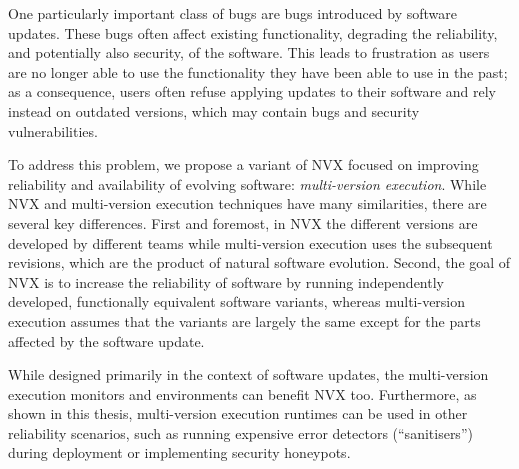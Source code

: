 
One particularly important class of bugs are bugs introduced by software
updates. These bugs often affect existing functionality, degrading the
reliability, and potentially also security, of the software. This leads to
frustration as users are no longer able to use the functionality they have been
able to use in the past; as a consequence, users often refuse applying updates
to their software and rely instead on outdated versions, which may contain bugs
and security vulnerabilities.

To address this problem, we propose a variant of NVX focused on improving
reliability and availability of evolving software: \emph{multi-version
execution}.  While NVX and multi-version execution techniques have many
similarities, there are several key differences.  First and foremost, in NVX
the different versions are developed by different teams while multi-version
execution uses the subsequent revisions, which are the product of natural
software evolution. Second, the goal of NVX is to increase the reliability of
software by running independently developed, functionally equivalent software
variants, whereas multi-version execution assumes that the variants are largely
the same except for the parts affected by the software update.

While designed primarily in the context of software updates, the multi-version
execution monitors and environments can benefit NVX too. Furthermore, as shown
in this thesis, multi-version execution runtimes can be used in other
reliability scenarios, such as running expensive error detectors
(``sanitisers'') during deployment or implementing security honeypots.


